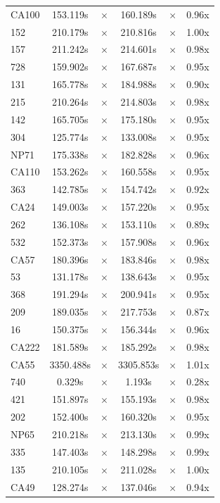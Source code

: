 \documentclass[a4paper,10pt]{article}
\begin{document}
\begin{longtable}{lccccc}
CA100 & 153.119s & $\times$ & 160.189s & $\times$ & 0.96x \\
152 & 210.179s & $\times$ & 210.816s & $\times$ & 1.00x \\
157 & 211.242s & $\times$ & 214.601s & $\times$ & 0.98x \\
728 & 159.902s & $\times$ & 167.687s & $\times$ & 0.95x \\
131 & 165.778s & $\times$ & 184.988s & $\times$ & 0.90x \\
215 & 210.264s & $\times$ & 214.803s & $\times$ & 0.98x \\
142 & 165.705s & $\times$ & 175.180s & $\times$ & 0.95x \\
304 & 125.774s & $\times$ & 133.008s & $\times$ & 0.95x \\
NP71 & 175.338s & $\times$ & 182.828s & $\times$ & 0.96x \\
CA110 & 153.262s & $\times$ & 160.558s & $\times$ & 0.95x \\
363 & 142.785s & $\times$ & 154.742s & $\times$ & 0.92x \\
CA24 & 149.003s & $\times$ & 157.220s & $\times$ & 0.95x \\
262 & 136.108s & $\times$ & 153.110s & $\times$ & 0.89x \\
532 & 152.373s & $\times$ & 157.908s & $\times$ & 0.96x \\
CA57 & 180.396s & $\times$ & 183.846s & $\times$ & 0.98x \\
53 & 131.178s & $\times$ & 138.643s & $\times$ & 0.95x \\
368 & 191.294s & $\times$ & 200.941s & $\times$ & 0.95x \\
209 & 189.035s & $\times$ & 217.753s & $\times$ & 0.87x \\
16 & 150.375s & $\times$ & 156.344s & $\times$ & 0.96x \\
CA222 & 181.589s & $\times$ & 185.292s & $\times$ & 0.98x \\
CA55 & 3350.488s & $\times$ & 3305.853s & $\times$ & 1.01x \\
740 & 0.329s & $\times$ & 1.193s & $\times$ & 0.28x \\
421 & 151.897s & $\times$ & 155.193s & $\times$ & 0.98x \\
202 & 152.400s & $\times$ & 160.320s & $\times$ & 0.95x \\
NP65 & 210.218s & $\times$ & 213.130s & $\times$ & 0.99x \\
335 & 147.403s & $\times$ & 148.298s & $\times$ & 0.99x \\
135 & 210.105s & $\times$ & 211.028s & $\times$ & 1.00x \\
CA49 & 128.274s & $\times$ & 137.046s & $\times$ & 0.94x \\
\bottomrule
\end{longtable}
\end{document}
